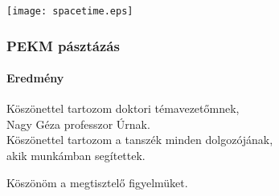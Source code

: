 \documentclass{beamer}
\begin{document}
\begin{frame}
	\centering
	\texttt{[image: spacetime.eps]}
	\frametitle{PEKM pásztázás}
	\framesubtitle{Eredmény}
\end{frame}

\begin{frame}
	\centering
	Köszönettel tartozom doktori témavezetőmnek,\\ Nagy Géza professzor Úrnak. \\ Köszönettel tartozom a tanszék minden dolgozójának, \\ akik munkámban segítettek.
\end{frame}

\begin{frame}
	\centering
	Köszönöm a megtisztelő figyelmüket.
\end{frame}
\end{document}
